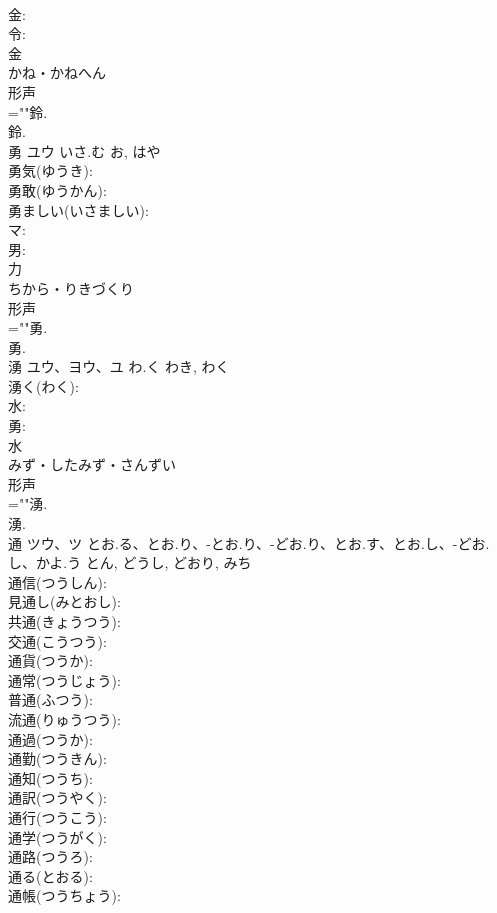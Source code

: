 \documentclass[8pt]{extreport}
\begin{document}
\begin{CJK}{UTF8}{min}
\\	金: 
\\	令: 
\\	金	
\\	かね・かねへん	
\\	形声 
\\	=""鈴.
\\	鈴.
\\	勇	ユウ	いさ.む	お, はや	
\\	勇気(ゆうき): 
\\	勇敢(ゆうかん): 
\\	勇ましい(いさましい): 
\\	マ: 
\\	男: 
\\	力	
\\	ちから・りきづくり	
\\	形声 
\\	=""勇.
\\	勇.
\\	湧	ユウ、ヨウ、ユ	わ.く	わき, わく	
\\	湧く(わく): 
\\	水: 
\\	勇: 
\\	水	
\\	みず・したみず・さんずい	
\\	形声 
\\	=""湧.
\\	湧.
\\	通	ツウ、ツ	とお.る、とお.り、-とお.り、-どお.り、とお.す、とお.し、-どお.し、かよ.う	とん, どうし, どおり, みち	
\\	通信(つうしん): 
\\	見通し(みとおし): 
\\	共通(きょうつう): 
\\	交通(こうつう): 
\\	通貨(つうか): 
\\	通常(つうじょう): 
\\	普通(ふつう): 
\\	流通(りゅうつう): 
\\	通過(つうか): 
\\	通勤(つうきん): 
\\	通知(つうち): 
\\	通訳(つうやく): 
\\	通行(つうこう): 
\\	通学(つうがく): 
\\	通路(つうろ): 
\\	通る(とおる): 
\\	通帳(つうちょう): 

\end{CJK}
\end{document}
